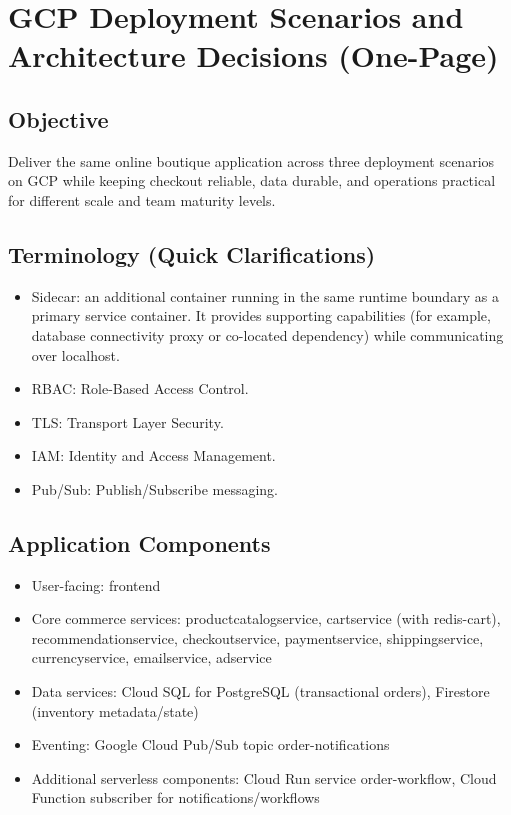 \documentclass[
]{article}
\author{}
\date{}
\providecommand{\tightlist}{%
  \setlength{\itemsep}{0pt}\setlength{\parskip}{0pt}}
\begin{document}
\section{GCP Deployment Scenarios and Architecture Decisions
(One-Page)}\label{gcp-deployment-scenarios-and-architecture-decisions-one-page}

\subsection{Objective}\label{objective}

Deliver the same online boutique application across three deployment
scenarios on GCP while keeping checkout reliable, data durable, and
operations practical for different scale and team maturity levels.

\subsection{Terminology (Quick
Clarifications)}\label{terminology-quick-clarifications}

\begin{itemize}
\tightlist
\item
  Sidecar: an additional container running in the same runtime boundary
  as a primary service container. It provides supporting capabilities
  (for example, database connectivity proxy or co-located dependency)
  while communicating over localhost.
\item
  RBAC: Role-Based Access Control.
\item
  TLS: Transport Layer Security.
\item
  IAM: Identity and Access Management.
\item
  Pub/Sub: Publish/Subscribe messaging.
\end{itemize}

\subsection{Application Components}\label{application-components}

\begin{itemize}
\tightlist
\item
  User-facing: frontend
\item
  Core commerce services: productcatalogservice, cartservice (with
  redis-cart), recommendationservice, checkoutservice, paymentservice,
  shippingservice, currencyservice, emailservice, adservice
\item
  Data services: Cloud SQL for PostgreSQL (transactional orders),
  Firestore (inventory metadata/state)
\item
  Eventing: Google Cloud Pub/Sub topic order-notifications
\item
  Additional serverless components: Cloud Run service order-workflow,
  Cloud Function subscriber for notifications/workflows
\end{itemize}
\end{document}
